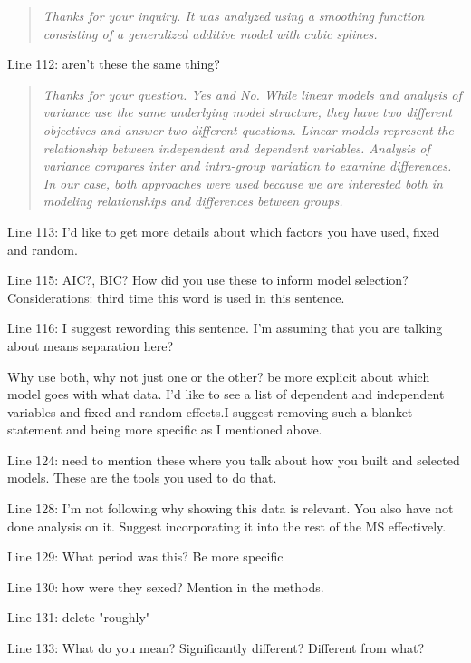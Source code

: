 \documentclass{article}
\begin{document}
\begin{quote}
    \textit{Thanks for your inquiry.  It was analyzed using a smoothing function consisting of a generalized additive model with cubic splines.  }
\end{quote}

Line 112: aren't these the same thing?

\begin{quote}
    \textit{Thanks for your question.  Yes and No.  While linear models and analysis of variance use the same underlying model structure, they have two different objectives and answer two different questions.  Linear models represent the relationship between independent and dependent variables.  Analysis of variance compares inter and intra-group variation to examine differences.  In our case, both approaches were used because we are interested both in modeling relationships and differences between groups.  }
\end{quote}

Line 113: I'd like to get more details about which factors you have used, fixed and random.  

\begin{quote}
    \textit{}
\end{quote}

Line 115: AIC?, BIC? How did you use these to inform model selection? Considerations: third time this word is used in this sentence.  

Line 116:  I suggest rewording this sentence. I'm assuming that you are talking about means separation here?

Why use both, why not just one or the other? be more explicit about which model goes with what data. I'd like to see a list of dependent and independent variables and fixed and random effects.I suggest removing such a blanket statement and being more specific as I mentioned above.

Line 124: need to mention these where you talk about how you built and selected models. These are the tools you used to do that.

Line 128: I'm not following why showing this data is relevant. You also have not done analysis on it. Suggest incorporating it into the rest of the MS effectively.

Line 129: What period was this? Be more specific

Line 130: how were they sexed? Mention in the methods.  

Line 131: delete "roughly"

Line 133: What do you mean? Significantly different? Different from what?
\end{document}
